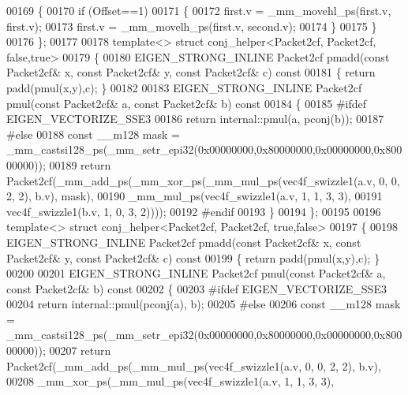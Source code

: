 \begin{DoxyCode}
00169   \{
00170     \textcolor{keywordflow}{if} (Offset==1)
00171     \{
00172       first.v = \_mm\_movehl\_ps(first.v, first.v);
00173       first.v = \_mm\_movelh\_ps(first.v, second.v);
00174     \}
00175   \}
00176 \};
00177 
00178 \textcolor{keyword}{template}<> \textcolor{keyword}{struct }conj\_helper<Packet2cf, Packet2cf, false,true>
00179 \{
00180   EIGEN\_STRONG\_INLINE Packet2cf pmadd(\textcolor{keyword}{const} Packet2cf& x, \textcolor{keyword}{const} Packet2cf& y, \textcolor{keyword}{const} Packet2cf& c)\textcolor{keyword}{ const}
00181 \textcolor{keyword}{  }\{ \textcolor{keywordflow}{return} padd(pmul(x,y),c); \}
00182 
00183   EIGEN\_STRONG\_INLINE Packet2cf pmul(\textcolor{keyword}{const} Packet2cf& a, \textcolor{keyword}{const} Packet2cf& b)\textcolor{keyword}{ const}
00184 \textcolor{keyword}{  }\{
00185 \textcolor{preprocessor}{    #ifdef EIGEN\_VECTORIZE\_SSE3}
00186     \textcolor{keywordflow}{return} internal::pmul(a, pconj(b));
00187 \textcolor{preprocessor}{    #else}
00188     \textcolor{keyword}{const} \_\_m128 mask = \_mm\_castsi128\_ps(\_mm\_setr\_epi32(0x00000000,0x80000000,0x00000000,0x80000000));
00189     \textcolor{keywordflow}{return} Packet2cf(\_mm\_add\_ps(\_mm\_xor\_ps(\_mm\_mul\_ps(vec4f\_swizzle1(a.v, 0, 0, 2, 2), b.v), mask),
00190                                 \_mm\_mul\_ps(vec4f\_swizzle1(a.v, 1, 1, 3, 3),
00191                                            vec4f\_swizzle1(b.v, 1, 0, 3, 2))));
00192 \textcolor{preprocessor}{    #endif}
00193   \}
00194 \};
00195 
00196 \textcolor{keyword}{template}<> \textcolor{keyword}{struct }conj\_helper<Packet2cf, Packet2cf, true,false>
00197 \{
00198   EIGEN\_STRONG\_INLINE Packet2cf pmadd(\textcolor{keyword}{const} Packet2cf& x, \textcolor{keyword}{const} Packet2cf& y, \textcolor{keyword}{const} Packet2cf& c)\textcolor{keyword}{ const}
00199 \textcolor{keyword}{  }\{ \textcolor{keywordflow}{return} padd(pmul(x,y),c); \}
00200 
00201   EIGEN\_STRONG\_INLINE Packet2cf pmul(\textcolor{keyword}{const} Packet2cf& a, \textcolor{keyword}{const} Packet2cf& b)\textcolor{keyword}{ const}
00202 \textcolor{keyword}{  }\{
00203 \textcolor{preprocessor}{    #ifdef EIGEN\_VECTORIZE\_SSE3}
00204     \textcolor{keywordflow}{return} internal::pmul(pconj(a), b);
00205 \textcolor{preprocessor}{    #else}
00206     \textcolor{keyword}{const} \_\_m128 mask = \_mm\_castsi128\_ps(\_mm\_setr\_epi32(0x00000000,0x80000000,0x00000000,0x80000000));
00207     \textcolor{keywordflow}{return} Packet2cf(\_mm\_add\_ps(\_mm\_mul\_ps(vec4f\_swizzle1(a.v, 0, 0, 2, 2), b.v),
00208                                 \_mm\_xor\_ps(\_mm\_mul\_ps(vec4f\_swizzle1(a.v, 1, 1, 3, 3),

\end{DoxyCode}
